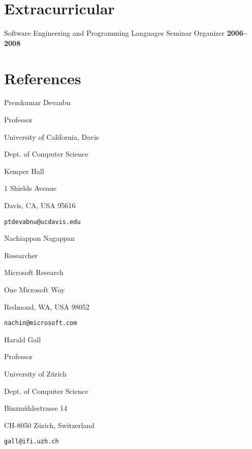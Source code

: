 \documentclass[margin,line,article]{res}
\newenvironment{list1}{
  \begin{list}{}{%
      \setlength{\itemsep}{0in}
      \setlength{\parsep}{0in} \setlength{\parskip}{0in}
      \setlength{\topsep}{0in} \setlength{\partopsep}{0in} 
      \setlength{\leftmargin}{0.17in}}}{\end{list}}
\begin{document}
\begin{resume}
\section{Extracurricular}
Software Engineering and Programming Languages Seminar Organizer \hfill \textbf{2006--2008}

\section{References}

Premkumar Devanbu
\begin{list1}
\item Professor
\item University of California, Davis
\item Dept. of Computer Science
\item Kemper Hall
\item 1 Shields Avenue
\item Davis, CA, USA 95616
\item \texttt{ptdevabnu@ucdavis.edu}
\end{list1}

Nachiappan Nagappan
\begin{list1}
\item Researcher
\item Microsoft Research
\item One Microsoft Way
\item Redmond, WA, USA 98052
\item \texttt{nachin@microsoft.com}
\end{list1}

Harald Gall
\begin{list1}
\item Professor
\item University of Z\"urich
\item Dept. of Computer Science
\item Binzm\"uhlestrasse 14
\item CH-8050 Z\"urich, Switzerland
\item \texttt{gall@ifi.uzh.ch}
\end{list1}



\end{resume}
\end{document}
